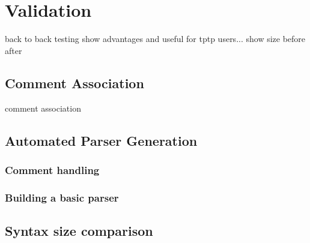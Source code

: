 
\chapter{Validation}\label{sec:Validation}
back to back testing
show advantages and useful for tptp users...
show size before after 
\section{Comment Association}\label{sec:ValidationCommentAssociation}
comment association


\section{Automated Parser Generation}\label{sec:ValidationAutomatedParserGeneration}
\subsection{Comment handling}\label{sec:ValidationAutomatedParserGenerationCommentHandling}
\subsection{Building a basic parser}\label{sec:ValidationAutomatedParserGenerationBuildingBasicParser}

\section{Syntax size comparison}\label{sec:ValidationSyntaxSizeComparison}

